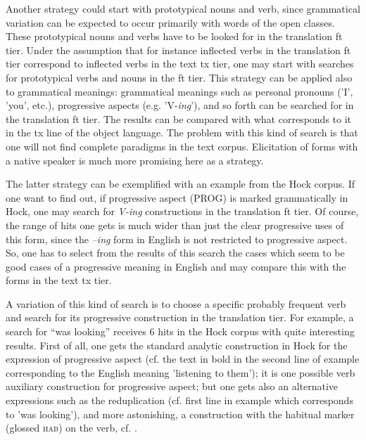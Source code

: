 Another strategy could start with prototypical nouns and verb, since grammatical variation can be expected to occur primarily with words of the open classes. These prototypical nouns and verbs have to be looked for in the translation ft tier. Under the assumption that for instance inflected verbs in the translation ft tier correspond to inflected verbs in the text tx tier, one may start with searches for prototypical verbs and nouns in the ft tier. This strategy can be applied also to grammatical meanings: grammatical meanings such as personal pronouns ('I', 'you', etc.), progressive aspects (e.g. 'V-\textit{ing}'), and so forth can be searched for in the translation ft tier. The results can be compared with what corresponds to it in the tx line of the object language. The problem with this kind of search is that one will not find complete paradigms in the text corpus. Elicitation of forms with a native speaker is much more promising here as a strategy.

The latter strategy can be exemplified with an example from the Hoc{\A}k corpus. If one want to find out, if progressive aspect (PROG) is marked grammatically in Hoc{\A}k, one may search for \textit{V-ing} constructions in the translation ft tier. Of course, the range of hits one gets is much wider than just the clear progressive uses of this form, since the \textit{--ing} form in English is not restricted to progressive aspect. So, one has to select from the results of this search the cases which seem to be good cases of a progressive meaning in English and may compare this with the forms in the text tx tier.

A variation of this kind of search is to choose a specific probably frequent verb and search for its progressive construction in the translation tier. For example, a search for ``was looking'' receives 6 hits in the Hoc{\A}k corpus with quite interesting results. First of all, one gets the standard analytic construction in Hoc{\A}k for the expression of progressive aspect (cf. the text in bold in the second line of example  corresponding to the English meaning 'listening to them'); it is one possible verb auxiliary construction for progressive aspect; but one gets also an alternative expressions such as the reduplication (cf. first line in example  which corresponds to 'was looking'), and more astonishing, a construction with the habitual marker (glossed \textsc{hab}) on the verb, cf. . 


